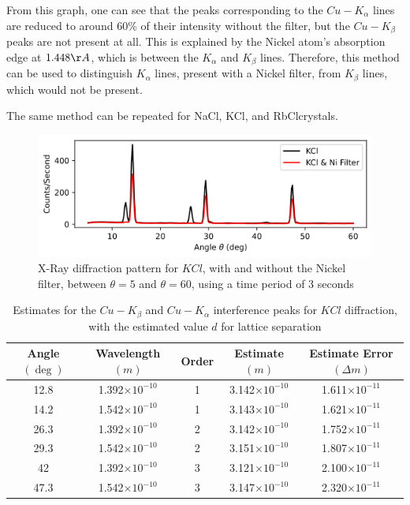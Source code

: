\documentclass[a4paper]{article}
\begin{document}
From this graph, one can see that the peaks corresponding to the $Cu-K_\alpha$ lines are reduced to around 60\% of their intensity without the filter, but the $Cu-K_\beta$ peaks are not present at all. This is explained by the Nickel atom's absorption edge at $1.448\r A$, which is between the $K_\alpha$ and $K_\beta$ lines. Therefore, this method can be used to distinguish $K_\alpha$ lines, present with a Nickel filter, from $K_\beta$ lines, which would not be present.

The same method can be repeated for NaCl\footnotemark[1], KCl\footnotemark[2], and RbCl\footnotemark[2] crystals.

\begin{figure}[h!]
\centerline{\includegraphics[scale=0.8]{kcl.png}}
\caption{X-Ray diffraction pattern for $KCl$, with and without the Nickel filter, between $\theta=5$ and $\theta=60$, using a time period of 3 seconds}
\label{fig:kcl}
\end{figure}


\begin{table}[h!]
\centering
\begin{tabular}{ccccc}
\hline
Angle $(\deg)$ & Wavelength $(m)$ & Order & Estimate $(m)$ & Estimate Error $(\Delta m)$\\ \hline
12.8 & 1.392$\times10^{-10}$ & 1 & 3.142$\times10^{-10}$ & 1.611$\times10^{-11}$ \\
14.2 & 1.542$\times10^{-10}$ & 1 & 3.143$\times10^{-10}$ & 1.621$\times10^{-11}$ \\
26.3 & 1.392$\times10^{-10}$  & 2 & 3.142$\times10^{-10}$ & 1.752$\times10^{-11}$ \\
29.3 & 1.542$\times10^{-10}$ & 2 & 3.151$\times10^{-10}$ & 1.807$\times10^{-11}$ \\
42 & 1.392$\times10^{-10}$  & 3 & 3.121$\times10^{-10}$ & 2.100$\times10^{-11}$ \\
47.3 & 1.542$\times10^{-10}$ & 3 & 3.147$\times10^{-10}$ & 2.320$\times10^{-11}$ \\
\end{tabular}
\caption{\label{tab:kcltab}Estimates for the $Cu-K_\beta$ and $Cu-K_\alpha$ interference peaks for $KCl$ diffraction, with the estimated value $d$ for lattice separation}
\end{table}
\end{document}
